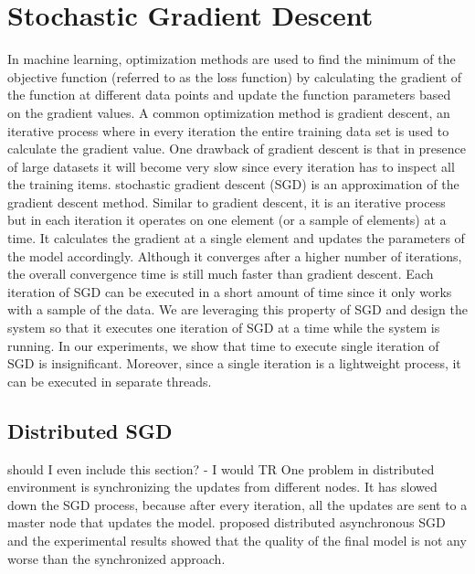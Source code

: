 \documentclass{sig-alternate-05-2015}
\begin{document}
\section{Stochastic Gradient Descent} \label{sgd}
In machine learning, optimization methods are used to find the minimum of the objective function (referred to as the loss function) by calculating the gradient of the function at different data points and update the function parameters based on the gradient values.
A common optimization method is gradient descent, an iterative process where in every iteration the entire training data set is used to calculate the gradient value.
One drawback of gradient descent is that in presence of large datasets it will become very slow since every iteration has to inspect all the training items.
stochastic gradient descent (SGD) is an approximation of the gradient descent method. 
Similar to gradient descent, it is an iterative process but in each iteration it operates on one element (or a sample of elements) at a time. 
It calculates the gradient at a single element and updates the parameters of the model accordingly. 
Although it converges after a higher number of iterations, the overall convergence time is still much faster than gradient descent. 
Each iteration of SGD can be executed in a short amount of time since it only works with a sample of the data.
We are leveraging this property of SGD and design the system so that it executes one iteration of SGD at a time while the system is running.
In our experiments,  we show that time to execute single iteration of SGD is insignificant.
Moreover, since a single iteration is a lightweight process, it can be executed in separate threads. 

\subsection{Distributed SGD}
{\color{red} should I even include this section? - I would TR}
One problem in distributed environment is synchronizing the updates from different nodes. 
It has slowed down the SGD process, because after every iteration, all the updates are sent to a master node that updates the model.
\cite{recht2011hogwild, dean2012large} proposed distributed asynchronous SGD and the experimental results showed that the quality of the final model is not any worse than the synchronized approach. 
\end{document}
